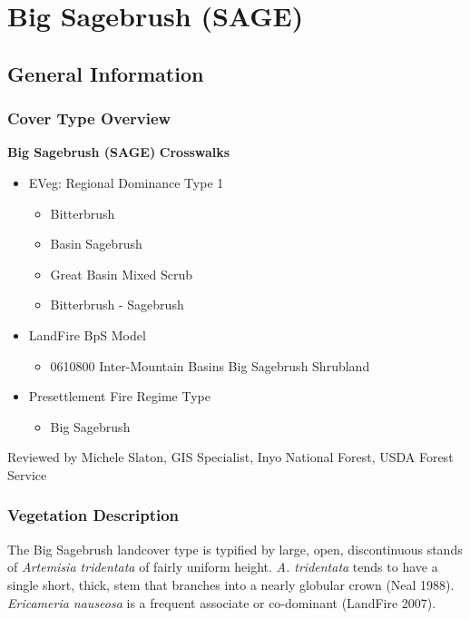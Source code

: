 \newpage

\section{Big Sagebrush (SAGE)}
\label{sage-description}

\subsection*{General Information}

\subsubsection{Cover Type Overview}

\textbf{Big Sagebrush (SAGE)}
\newline
\textbf{Crosswalks}
\begin{itemize}
	\item EVeg: Regional Dominance Type 1
	\begin{itemize}
		\item Bitterbrush 
		\item Basin Sagebrush
		\item Great Basin Mixed Scrub
		\item Bitterbrush - Sagebrush
	\end{itemize}

	\item LandFire BpS Model
	\begin{itemize}
		\item 0610800 Inter-Mountain Basins Big Sagebrush Shrubland
	\end{itemize}

	\item Presettlement Fire Regime Type
	\begin{itemize}
		\item Big Sagebrush
	\end{itemize}
\end{itemize}

\noindent Reviewed by Michele Slaton, GIS Specialist, Inyo National Forest, USDA Forest Service

\subsubsection{Vegetation Description}
The Big Sagebrush landcover type is typified by large, open, discontinuous stands of \emph{Artemisia tridentata} of fairly uniform height. \emph{A. tridentata} tends to have a single short, thick, stem that branches into a nearly globular crown (Neal 1988). \emph{Ericameria nauseosa} is a frequent associate or co-dominant (LandFire 2007).

